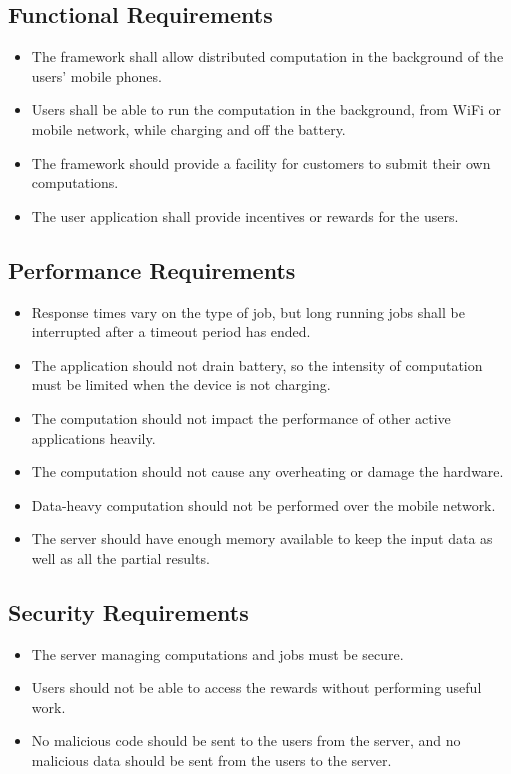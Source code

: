 \documentclass[a4paper,10pt]{article}
\begin{document}
\subsection{Functional Requirements}

\begin{itemize}
	\item The framework shall allow distributed computation in the background of the users’ mobile phones.
	\item Users shall be able to run the computation in the background, from WiFi or mobile network, while charging and off the battery.
	\item The framework should provide a facility for customers to submit their own computations.
	\item The user application shall provide incentives or rewards for the users.
\end{itemize} 

\subsection{Performance Requirements}

\begin{itemize}
	\item Response times vary on the type of job, but long running jobs shall be interrupted after a timeout period has ended.
	\item The application should not drain battery, so the intensity of computation must be limited when the device is not charging.
	\item The computation should not impact the performance of other active applications heavily.
	\item The computation should not cause any overheating or damage the hardware.
	\item Data-heavy computation should not be performed over the mobile network.
	\item The server should have enough memory available to keep the input data as well as all the partial results.
\end{itemize} 

\subsection{Security Requirements}

\begin{itemize}
	\item The server managing computations and jobs must be secure.
	\item Users should not be able to access the rewards without performing useful work.
	\item No malicious code should be sent to the users from the server, and no malicious data should be sent from the users to the server.
\end{itemize} 
\end{document}
